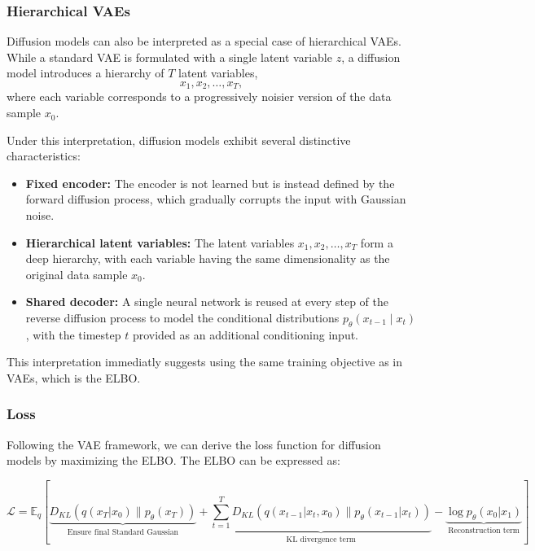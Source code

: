 \subsubsection{Hierarchical VAEs}

Diffusion models can also be interpreted as a special case of hierarchical VAEs. While a standard VAE is formulated with a single latent variable \(z\), a diffusion model introduces a hierarchy of \(T\) latent variables,
\[
    x_1, x_2, \ldots, x_T,
\]
where each variable corresponds to a progressively noisier version of the data sample \(x_0\).

Under this interpretation, diffusion models exhibit several distinctive characteristics:

\begin{itemize}
    \item \textbf{Fixed encoder:} The encoder is not learned but is instead defined by the forward diffusion process, which gradually corrupts the input with Gaussian noise.
    \item \textbf{Hierarchical latent variables:} The latent variables \(x_1, x_2, \ldots, x_T\) form a deep hierarchy, with each variable having the same dimensionality as the original data sample \(x_0\).
    \item \textbf{Shared decoder:} A single neural network is reused at every step of the reverse diffusion process to model the conditional distributions \(p_\theta(x_{t-1}\mid x_t)\), with the timestep \(t\) provided as an additional conditioning input.
\end{itemize}

This interpretation immediatly suggests using the same training objective as in VAEs, which is the ELBO.

\subsubsection{Loss}
Following the VAE framework, we can derive the loss function for diffusion models by maximizing the ELBO. The ELBO can be expressed as:

\[
    \mathcal{L} = \mathbb{E}_{q} \left[ 
        \underbrace{D_{KL}(q(x_{T} | x_0) \| p_\theta(x_T))}_{\text{Ensure final Standard Gaussian}} +
        \underbrace{\sum_{t=1}^{T} D_{KL}(q(x_{t-1} | x_t, x_0) \| p_\theta(x_{t-1} | x_t))}_{\text{KL divergence term}} -
        \underbrace{\log p_\theta(x_0 | x_1)}_{\text{Reconstruction term}}
        \right]
\]

